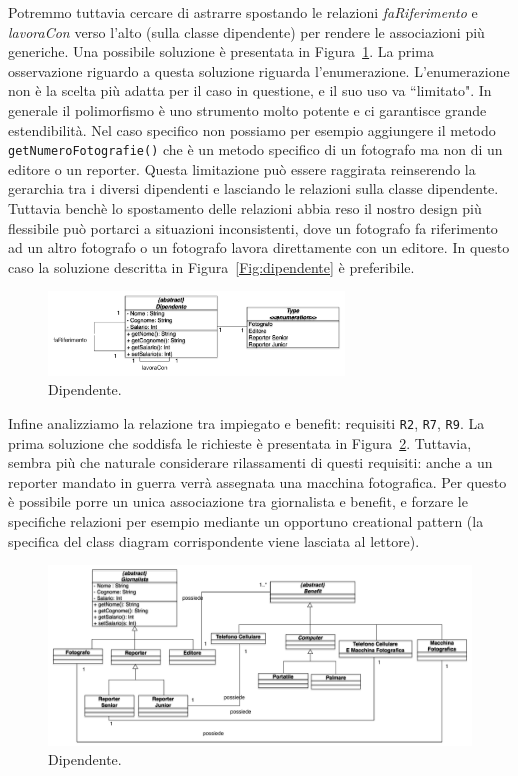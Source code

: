 \documentclass{article}
\begin{document}
Potremmo tuttavia cercare di astrarre  spostando le relazioni \emph{faRiferimento} e \emph{lavoraCon} verso l'alto (sulla classe dipendente) per rendere le associazioni pi\`u generiche. Una possibile soluzione \`e presentata in Figura~\ref{Fig:dipendente2}. La prima osservazione riguardo a questa soluzione riguarda  l'enumerazione. L'enumerazione non \`e la scelta pi\`u adatta per il caso in questione, e il suo uso va ``limitato". In generale il polimorfismo \`e uno strumento molto potente e ci garantisce grande estendibilit\`a. Nel caso specifico non possiamo per esempio aggiungere il metodo \texttt{getNumeroFotografie()} che \`e un metodo specifico di un fotografo ma non di un editore o un reporter. Questa limitazione pu\`o essere raggirata reinserendo la gerarchia tra i diversi dipendenti e lasciando le relazioni sulla classe dipendente. Tuttavia bench\`e lo spostamento delle relazioni abbia reso il nostro design pi\`u flessibile pu\`o portarci a situazioni inconsistenti, dove un fotografo fa riferimento ad un altro fotografo o un fotografo lavora direttamente con un editore. In questo caso la soluzione descritta in Figura~\ref{Fig:dipendente} \`e preferibile.
\begin{figure}[h!]
  \centering
    \includegraphics[width=0.7\textwidth]{Img/dipendente2.pdf}
 \caption{Dipendente.}
      \label{Fig:dipendente2}
\end{figure}
\clearpage
Infine analizziamo la relazione tra impiegato e benefit: requisiti \texttt{R2}, \texttt{R7}, \texttt{R9}. La prima soluzione che soddisfa le richieste \`e presentata in Figura~\ref{Fig:dipendentebenefit}. Tuttavia, sembra pi\`u che naturale considerare rilassamenti di questi requisiti: anche a un reporter mandato in guerra verr\`a assegnata una macchina fotografica. Per questo \`e possibile porre un unica associazione tra giornalista e benefit, e forzare le specifiche relazioni per esempio mediante un opportuno creational pattern (la specifica del class diagram corrispondente viene lasciata al lettore).
\begin{figure}[h!]
  \centering
    \includegraphics[width=1\textwidth]{Img/impiegatobenefit.pdf}
 \caption{Dipendente.}
      \label{Fig:dipendentebenefit}
\end{figure}
\clearpage
\end{document}
